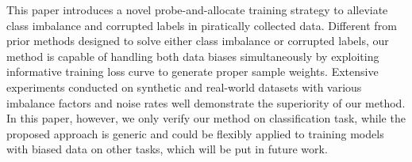 \documentclass[letterpaper]{article} %
\begin{document}
This paper introduces a novel probe-and-allocate training strategy to alleviate class imbalance and corrupted labels in piratically collected data.
Different from prior methods designed to solve either class imbalance or corrupted labels, our method is capable of handling both data biases simultaneously by exploiting informative training loss curve to generate proper sample weights.
Extensive experiments conducted on synthetic and real-world datasets with various imbalance factors and noise rates well demonstrate the superiority of our method.
In this paper, however, we only verify our method on classification task, while the proposed approach is generic and could be flexibly applied to training models with biased data on other tasks, which  will be put in future work.

\vspace{-0.85mm}
\vspace{-1.45mm}
\end{document}
